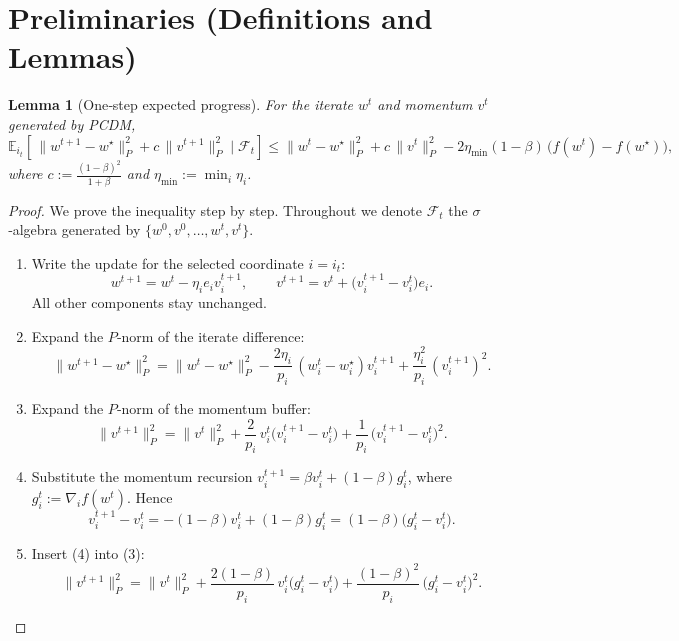 \documentclass{article}
\newtheorem{lemma}{Lemma}
\newcommand{\E}{\mathbb{E}}
\begin{document}
\section*{Preliminaries (Definitions and Lemmas)}
\begin{lemma}[One‑step expected progress]\label{lem:one-step}
For the iterate $w^{t}$ and momentum $v^{t}$ generated by PCDM,
\[
\E_{i_t}\!\left[\,\|w^{t+1}-w^{\star}\|_{P}^{2}+c\,\|v^{t+1}\|_{P}^{2}\mid\mathcal{F}_{t}\right]
\le
\|w^{t}-w^{\star}\|_{P}^{2}+c\,\|v^{t}\|_{P}^{2}
-2\eta_{\min}(1-\beta)\,\bigl(f(w^{t})-f(w^{\star})\bigr),
\]
where $c:=\frac{(1-\beta)^{2}}{1+\beta}$ and $\eta_{\min}:=\min_{i}\eta_i$.
\end{lemma}
\begin{proof}
We prove the inequality step by step. Throughout we denote $\mathcal{F}_{t}$ the $\sigma$‑algebra generated by $\{w^{0},v^{0},\dots,w^{t},v^{t}\}$.

\begin{enumerate}[label=[Step \arabic*],leftmargin=*]
\item Write the update for the selected coordinate $i=i_t$:
\[
w^{t+1}=w^{t}-\eta_{i}e_i v_{i}^{t+1},\qquad 
v^{t+1}=v^{t}+\bigl(v_{i}^{t+1}-v_{i}^{t}\bigr)e_i .
\tag{1}
\]
All other components stay unchanged.

\item Expand the $P$‑norm of the iterate difference:
\[
\|w^{t+1}-w^{\star}\|_{P}^{2}
 =\|w^{t}-w^{\star}\|_{P}^{2}
   -\frac{2\eta_i}{p_i}\,(w_i^{t}-w_i^{\star})v_{i}^{t+1}
   +\frac{\eta_i^{2}}{p_i}\,(v_{i}^{t+1})^{2}.
\tag{2}
\]

\item Expand the $P$‑norm of the momentum buffer:
\[
\|v^{t+1}\|_{P}^{2}
 =\|v^{t}\|_{P}^{2}
   +\frac{2}{p_i}\,v_{i}^{t}\bigl(v_{i}^{t+1}-v_{i}^{t}\bigr)
   +\frac{1}{p_i}\,\bigl(v_{i}^{t+1}-v_{i}^{t}\bigr)^{2}.
\tag{3}
\]

\item Substitute the momentum recursion $v_{i}^{t+1}= \beta v_{i}^{t}+(1-\beta)g_{i}^{t}$,
where $g_{i}^{t}:=\nabla_i f(w^{t})$.  Hence
\[
v_{i}^{t+1}-v_{i}^{t}= - (1-\beta)v_{i}^{t} + (1-\beta)g_{i}^{t}
                     = (1-\beta)\bigl(g_{i}^{t}-v_{i}^{t}\bigr).
\tag{4}
\]

\item Insert (4) into (3):
\[
\|v^{t+1}\|_{P}^{2}
 =\|v^{t}\|_{P}^{2}
   +\frac{2(1-\beta)}{p_i}\,v_{i}^{t}\bigl(g_{i}^{t}-v_{i}^{t}\bigr)
   +\frac{(1-\beta)^{2}}{p_i}\,\bigl(g_{i}^{t}-v_{i}^{t}\bigr)^{2}.
\tag{5}
\]


\end{enumerate}
\end{proof}
\end{document}
